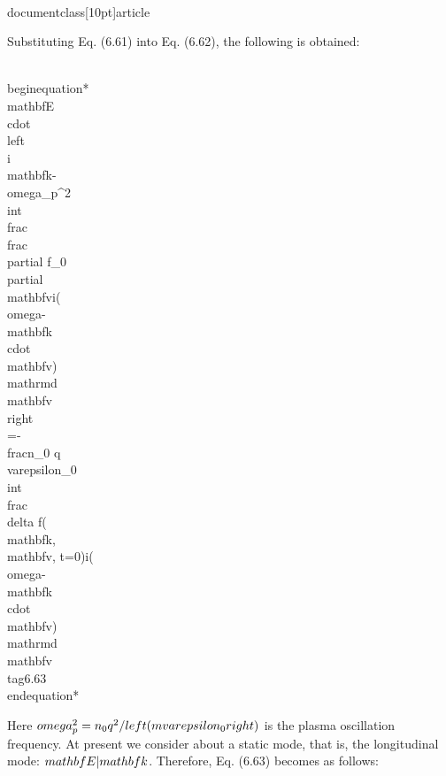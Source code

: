 \\documentclass[10pt]{article}
\begin{document}
{{{{Substituting Eq. (6.61) into Eq. (6.62), the following is obtained:


\\begin{equation*}
\\mathbf{E} \\cdot\\left\\{i \\mathbf{k}-\\omega_{p}^{2} \\int \\frac{\\frac{\\partial f_{0}}{\\partial \\mathbf{v}}}{i(\\omega-\\mathbf{k} \\cdot \\mathbf{v})} \\mathrm{d} \\mathbf{v}\\right\\}=-\\frac{n_{0} q}{\\varepsilon_{0}} \\int \\frac{\\delta f(\\mathbf{k}, \\mathbf{v}, t=0)}{i(\\omega-\\mathbf{k} \\cdot \\mathbf{v})} \\mathrm{d} \\mathbf{v} \\tag{6.63}
\\end{equation*}


Here $\\omega_{p}^{2}=n_{0} q^{2} /\\left(m \\varepsilon_{0}\\right)$ is the plasma oscillation frequency. At present we consider about a static mode, that is, the longitudinal mode: $\\mathbf{E} \\| \\mathbf{k}$. Therefore, Eq. (6.63) becomes as follows:


}}}}
\end{document}
